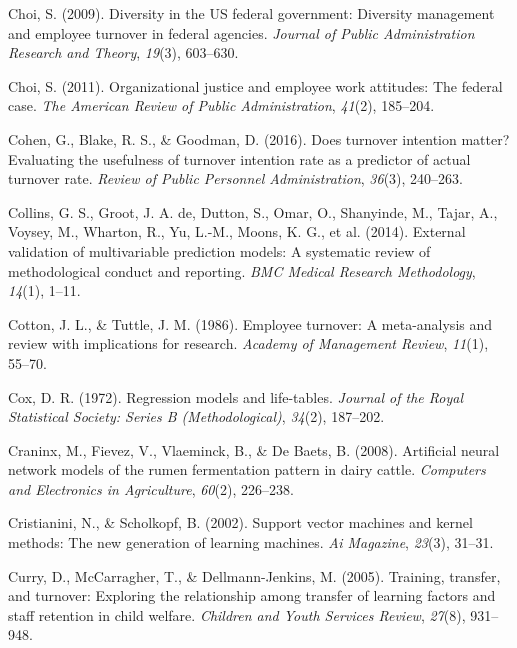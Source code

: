 \documentclass[
  jou]{apa6}
\newlength{\cslhangindent}
\newlength{\cslentryspacingunit} %
\newenvironment{CSLReferences}[2] %
 {%
  \setlength{\parindent}{0pt}
  \ifodd #1
  \let\oldpar\par
  \def\par{\hangindent=\cslhangindent\oldpar}
  \fi
  \setlength{\parskip}{#2\cslentryspacingunit}
 }%
 {}
\begin{document}
\begin{CSLReferences}{1}{0}
\leavevmode{}%
Choi, S. (2009). Diversity in the US federal government: Diversity management and employee turnover in federal agencies. \emph{Journal of Public Administration Research and Theory}, \emph{19}(3), 603--630.

\leavevmode{}%
Choi, S. (2011). Organizational justice and employee work attitudes: The federal case. \emph{The American Review of Public Administration}, \emph{41}(2), 185--204.

\leavevmode{}%
Cohen, G., Blake, R. S., \& Goodman, D. (2016). Does turnover intention matter? Evaluating the usefulness of turnover intention rate as a predictor of actual turnover rate. \emph{Review of Public Personnel Administration}, \emph{36}(3), 240--263.

\leavevmode{}%
Collins, G. S., Groot, J. A. de, Dutton, S., Omar, O., Shanyinde, M., Tajar, A., Voysey, M., Wharton, R., Yu, L.-M., Moons, K. G., et al. (2014). External validation of multivariable prediction models: A systematic review of methodological conduct and reporting. \emph{BMC Medical Research Methodology}, \emph{14}(1), 1--11.

\leavevmode{}%
Cotton, J. L., \& Tuttle, J. M. (1986). Employee turnover: A meta-analysis and review with implications for research. \emph{Academy of Management Review}, \emph{11}(1), 55--70.

\leavevmode{}%
Cox, D. R. (1972). Regression models and life-tables. \emph{Journal of the Royal Statistical Society: Series B (Methodological)}, \emph{34}(2), 187--202.

\leavevmode{}%
Craninx, M., Fievez, V., Vlaeminck, B., \& De Baets, B. (2008). Artificial neural network models of the rumen fermentation pattern in dairy cattle. \emph{Computers and Electronics in Agriculture}, \emph{60}(2), 226--238.

\leavevmode{}%
Cristianini, N., \& Scholkopf, B. (2002). Support vector machines and kernel methods: The new generation of learning machines. \emph{Ai Magazine}, \emph{23}(3), 31--31.

\leavevmode{}%
Curry, D., McCarragher, T., \& Dellmann-Jenkins, M. (2005). Training, transfer, and turnover: Exploring the relationship among transfer of learning factors and staff retention in child welfare. \emph{Children and Youth Services Review}, \emph{27}(8), 931--948.


\end{CSLReferences}
\end{document}
